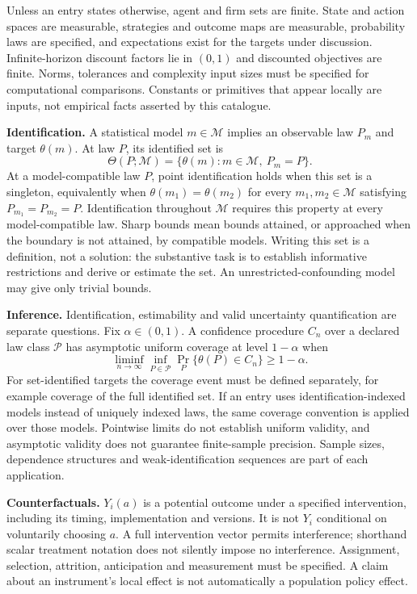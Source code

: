 \documentclass[11pt,a4paper]{article}
\begin{document}
Unless an entry states otherwise, agent and firm sets are finite. State and action spaces are measurable, strategies and outcome maps are measurable, probability laws are specified, and expectations exist for the targets under discussion. Infinite-horizon discount factors lie in $(0,1)$ and discounted objectives are finite. Norms, tolerances and complexity input sizes must be specified for computational comparisons. Constants or primitives that appear locally are inputs, not empirical facts asserted by this catalogue.

\textbf{Identification.} A statistical model $m\in\mathcal M$ implies an observable law $P_m$ and target $\theta(m)$. At law $P$, its identified set is
\[
\Theta(P;\mathcal M)=\{\theta(m):m\in\mathcal M,\ P_m=P\}.
\]
At a model-compatible law $P$, point identification holds when this set is a singleton, equivalently when $\theta(m_1)=\theta(m_2)$ for every $m_1,m_2\in\mathcal M$ satisfying $P_{m_1}=P_{m_2}=P$. Identification throughout $\mathcal M$ requires this property at every model-compatible law. Sharp bounds mean bounds attained, or approached when the boundary is not attained, by compatible models. Writing this set is a definition, not a solution: the substantive task is to establish informative restrictions and derive or estimate the set. An unrestricted-confounding model may give only trivial bounds.

\textbf{Inference.} Identification, estimability and valid uncertainty quantification are separate questions. Fix $\alpha\in(0,1)$. A confidence procedure $C_n$ over a declared law class $\mathcal P$ has asymptotic uniform coverage at level $1-\alpha$ when
\[
\liminf_{n\to\infty}\inf_{P\in\mathcal P}\Pr_P\{\theta(P)\in C_n\}\geq1-\alpha.
\]
For set-identified targets the coverage event must be defined separately, for example coverage of the full identified set. If an entry uses identification-indexed models instead of uniquely indexed laws, the same coverage convention is applied over those models. Pointwise limits do not establish uniform validity, and asymptotic validity does not guarantee finite-sample precision. Sample sizes, dependence structures and weak-identification sequences are part of each application.

\textbf{Counterfactuals.} $Y_i(a)$ is a potential outcome under a specified intervention, including its timing, implementation and versions. It is not $Y_i$ conditional on voluntarily choosing $a$. A full intervention vector permits interference; shorthand scalar treatment notation does not silently impose no interference. Assignment, selection, attrition, anticipation and measurement must be specified. A claim about an instrument's local effect is not automatically a population policy effect.
\end{document}
